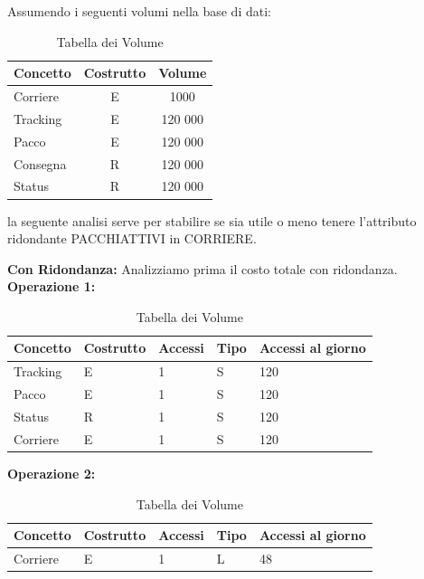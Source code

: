 Assumendo i seguenti volumi nella base di dati:

\begin{table}[ht]
\centering
\begin{tabular}{lcc}
\toprule
\textbf{Concetto} & \textbf{Costrutto} & \textbf{Volume} \\ [0.5ex]
\midrule
    Corriere & E & 1000 \\
    Tracking & E & 120 000 \\
    Pacco & E & 120 000 \\
    Consegna & R & 120 000 \\
    Status & R & 120 000 \\
\bottomrule
    \end{tabular}
    \caption{Tabella dei Volume}
\end{table}


la seguente analisi serve per stabilire se sia utile o meno tenere l’attributo ridondante
PACCHIATTIVI in CORRIERE.

\textbf{Con Ridondanza:} Analizziamo prima il costo totale con ridondanza.\\
\textbf{Operazione 1:} 

\begin{table}[ht]
\centering
\begin{tabular} {lllll}
    \toprule
    \textbf{Concetto} & \textbf{Costrutto} & \textbf{Accessi} & \textbf{Tipo} & \textbf{Accessi al giorno}\\ [0.5ex]
    \midrule
        Tracking & E & 1 & S & 120\\
        Pacco & E & 1 & S & 120\\
        Status & R & 1 & S & 120\\
        Corriere & E & 1 & S & 120\\
    \bottomrule
\end{tabular}
\caption{Tabella dei Volume}
\end{table}


\textbf{Operazione 2:}\\
\begin{table}[ht]
\centering
\begin{tabular} {lllll}
    \toprule
    \textbf{Concetto} & \textbf{Costrutto} & \textbf{Accessi} & \textbf{Tipo} & \textbf{Accessi al giorno}\\ [0.5ex]
    \midrule
        Corriere & E & 1 & L & 48\\
    \bottomrule
\end{tabular}
\caption{Tabella dei Volume}
\end{table}

